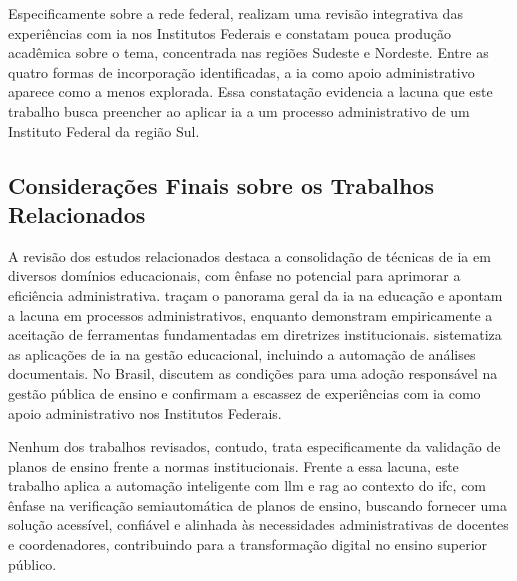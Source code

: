 Especificamente sobre a rede federal,  realizam uma revisão integrativa das experiências com \gls{ia} nos Institutos Federais e constatam pouca produção acadêmica sobre o tema, concentrada nas regiões Sudeste e Nordeste. Entre as quatro formas de incorporação identificadas, a \gls{ia} como apoio administrativo aparece como a menos explorada. Essa constatação evidencia a lacuna que este trabalho busca preencher ao aplicar \gls{ia} a um processo administrativo de um Instituto Federal da região Sul.

\subsection{Considerações Finais sobre os Trabalhos Relacionados}
A revisão dos estudos relacionados destaca a consolidação de técnicas de \gls{ia} em diversos domínios educacionais, com ênfase no potencial para aprimorar a eficiência administrativa.  traçam o panorama geral da \gls{ia} na educação e apontam a lacuna em processos administrativos, enquanto  demonstram empiricamente a aceitação de ferramentas fundamentadas em diretrizes institucionais.  sistematiza as aplicações de \gls{ia} na gestão educacional, incluindo a automação de análises documentais. No Brasil,  discutem as condições para uma adoção responsável na gestão pública de ensino e  confirmam a escassez de experiências com \gls{ia} como apoio administrativo nos Institutos Federais.

Nenhum dos trabalhos revisados, contudo, trata especificamente da validação de planos de ensino frente a normas institucionais. Frente a essa lacuna, este trabalho aplica a automação inteligente com \gls{llm} e \gls{rag} ao contexto do \gls{ifc}, com ênfase na verificação semiautomática de planos de ensino, buscando fornecer uma solução acessível, confiável e alinhada às necessidades administrativas de docentes e coordenadores, contribuindo para a transformação digital no ensino superior público.
